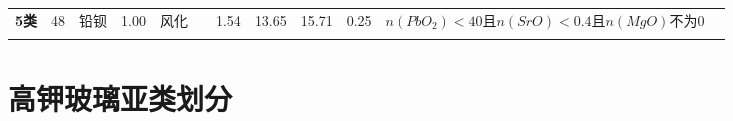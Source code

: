 \documentclass[withoutpreface,bwprint]{cumcmthesis} %
\begin{document}
\begin{appendices}
\begin{table}[!h]
\begin{tabular}{@{}llllllllllll@{}}
			\textbf{5类} & 48             & 铅钡          & 1.00      & 风化            &             & 1.54              & 13.65               & 15.71             & 0.25              & $n(PbO_2)<40$且$n(SrO)<0.4$且$n(MgO)不为0$ &           \\
			\textbf{}   &                &             &           &               &             &                   &                     &                   &                   &                                        &           \\ \bottomrule
		\end{tabular}
	\end{table}

\newpage

\section{高钾玻璃亚类划分}
\label{gjyl}


\end{appendices}
\end{document}
